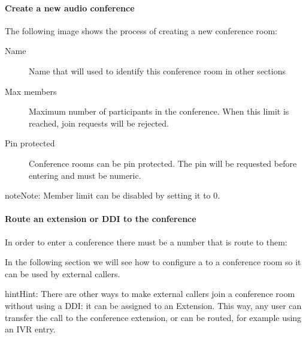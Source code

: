 \documentclass[letterpaper,10pt,english]{sphinxmanual}
\begin{document}
\paragraph{Create a new audio conference}

The following image shows the process of creating a new conference room:
\begin{description}
\item[{Name}] \leavevmode{}\label{administration_portal/client/vpbx/routing_endpoints/conference_rooms:term-name}
Name that will used to identify this conference room in other sections

\item[{Max members}] \leavevmode{}\label{administration_portal/client/vpbx/routing_endpoints/conference_rooms:term-max-members}
Maximum number of participants in the conference. When this limit is
reached, join requests will be rejected.

\item[{Pin protected}] \leavevmode{}\label{administration_portal/client/vpbx/routing_endpoints/conference_rooms:term-pin-protected}
Conference rooms can be pin protected. The pin will be requested before
entering and must be numeric.

\end{description}

\begin{notice}{note}{Note:}
Member limit can be disabled by setting it to 0.
\end{notice}
\paragraph{Route an extension or DDI to the conference}

In order to enter a conference there must be a number that is route to them:

In the following section we will see how to configure a {\hyperref[administration_portal/client/vpbx/ddis:ddis]{}} to a conference room so it can be used by external callers.

\begin{notice}{hint}{Hint:}
There are other ways to make external callers join a conference room
without using a DDI: it can be assigned to an Extension. This way, any user
can transfer the call to the conference extension, or can be routed, for
example using an IVR entry.
\end{notice}
\end{document}
